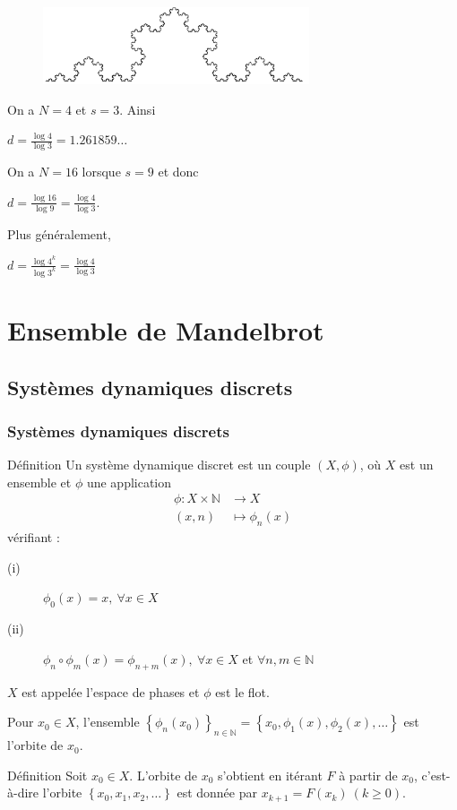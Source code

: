 \documentclass[aspectratio=1610]{beamer}
\begin{document}
\begin{frame}
\begin{minipage}{0.5\textwidth}
\begin{figure}[h]
    \includegraphics[width=0.7\textwidth,left]{IMG_1492}
    \label{fig:IMG_1492}
\end{figure}
\end{minipage}%
\begin{minipage}{0.5\textwidth}
\raggedright
On a $N=4$ et $s=3$. Ainsi 

$d=\frac{\log 4}{\log 3}=1.261859\ldots$

On a $N=16$ lorsque $s=9$ et donc 

$d=\frac{\log 16}{\log 9}=\frac{\log 4}{\log 3}$.

Plus généralement, 

$d=\frac{\log 4^{k}}{\log 3^{k}}=\frac{\log 4}{\log 3}$
\end{minipage}
\end{frame}

\section{Ensemble de Mandelbrot}
\subsection{Systèmes dynamiques discrets}

\begin{frame}
\frametitle{Systèmes dynamiques discrets}
   \begin{block}{Définition}
       Un système dynamique discret est un couple $\left( X,\phi \right)$, où $X$ est un ensemble et $\phi$ une application
\[
\begin{align*}
    \phi: X\times \mathbb{N} &\longrightarrow X  \\
    (x,n) &\longmapsto \phi_n(x) 
\end{align*}
\]
vérifiant : 
\begin{description}
    \item[(i)] $\phi_0(x)=x, \ \forall x \in X$
    \item[(ii)] $ \phi_n \circ \phi_m(x)=\phi_{n+m}(x) ,  \ \forall x \in X$ et $\forall n,m \in \mathbb{N}$ 
\end{description}
$X$ est appelée l'espace de phases et $\phi$ est le flot. 

Pour $x_0 \in X$, l'ensemble $\left\{ \phi_n(x_0) \right\}_{n \in \mathbb{N}}=\left\{ x_0,\phi_1(x),\phi_2(x),\ldots \right\}$ est l'orbite de $x_0$.
   \end{block} 
\begin{block}{Définition}
Soit $x_0 \in X$. L'orbite de $x_0$ s'obtient en itérant $F$ à partir de $x_0$, c'est-à-dire l'orbite $\left\{ x_0,x_1,x_2, \ldots\right\}$ est donnée par $x_{k+1}=F\left( x_k \right)  \ (k\ge 0) $.
\end{block}
\end{frame}
\end{document}
